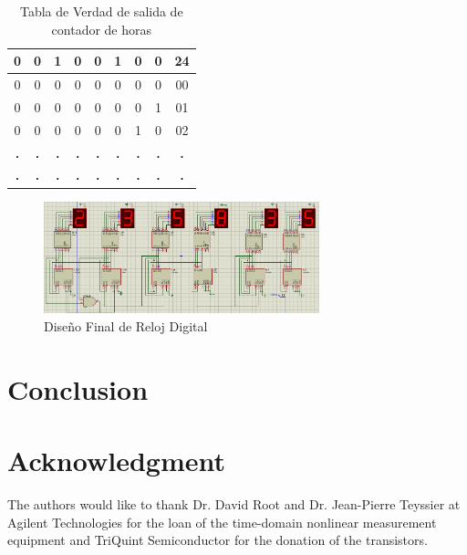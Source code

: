 \begin{table}[]
\begin{tabular}{|c|c|c|c|c|c|c|c|c|}
    \rowcolor[HTML]{F8FF00} 
    0 & 0 & 1 & 0 & 0 & 1 & 0 & 0 & 24 \\ \hline
    0 & 0 & 0 & 0 & 0 & 0 & 0 & 0 & 00 \\ \hline
    0 & 0 & 0 & 0 & 0 & 0 & 0 & 1 & 01 \\ \hline
    0 & 0 & 0 & 0 & 0 & 0 & 1 & 0 & 02 \\ \hline
    \textbf{.} & \textbf{.} & \textbf{.} & \textbf{.} & \textbf{.} & \textbf{.} & \textbf{.} & \textbf{.} & \textbf{.} \\ \hline
    \textbf{.} & \textbf{.} & \textbf{.} & \textbf{.} & \textbf{.} & \textbf{.} & \textbf{.} & \textbf{.} & \textbf{.} \\ \hline
    \end{tabular}
    \caption{Tabla de Verdad de salida de contador de horas}\label{osiloscop_sim}
    \end{table}

    \begin{figure}[h]
        \begin{center}
        \includegraphics[width=8cm]{images/image9.png}
        \newline
        \caption{Diseño Final de Reloj Digital}\label{Diseño_final}
        \end{center}
    \end{figure}
\section{Conclusion}


\section*{Acknowledgment}


The authors would like to thank Dr. David Root and Dr. Jean-Pierre Teyssier at Agilent Technologies for the loan of the time-domain nonlinear measurement equipment and TriQuint Semiconductor for the donation of the transistors. 




